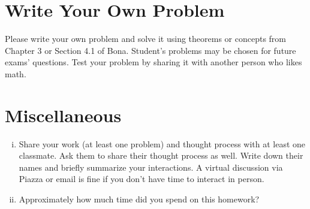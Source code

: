 \documentclass[12pt]{amsart}
\begin{document}
\section{Write Your Own Problem}\label{sec:write_your_own}
Please write your own problem and solve it using theorems or concepts from Chapter 3 or Section 4.1 of Bona. Student's problems may be chosen for future exams' questions. Test your problem by sharing it with another person who likes math. 



\section{Miscellaneous}
\begin{enumerate}[i.]
    \item Share your work (at least one problem) and thought process with at least one classmate. Ask them to share their thought process as well. Write down their names and briefly summarize your interactions. A virtual discussion via Piazza or email is fine if you don't have time to interact in person. 
    \item Approximately how much time did you spend on this homework?
\end{enumerate}
\end{document}
